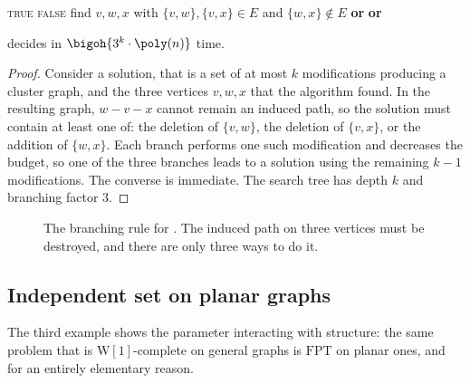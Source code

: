 \begin{algorithm}[ht]
\caption{Branching for }
\label{alg:fpt-cluster}
\begin{algorithmic}[1]
     \Return \textsc{true} \EndIf
     \Return \textsc{false} \EndIf
    \State find $v,w,x$ with $\{v,w\},\{v,x\} \in E$ and $\{w,x\} \notin E$
    \State \Return {} \textbf{ or }
                    \textbf{ or }
  \EndFunction
\end{algorithmic}
\end{algorithm}

\begin{theorem}\label{thm:fpt-cluster}
 decides  in
$\bigoh{3^k \cdot \poly(n)}$ time.
\end{theorem}

\begin{proof}
Consider a solution, that is a set of at most $k$ modifications producing a
cluster graph, and the three vertices $v,w,x$ that the algorithm found. In the
resulting graph, $w-v-x$ cannot remain an induced path, so the solution must
contain at least one of: the deletion of $\{v,w\}$, the deletion of $\{v,x\}$,
or the addition of $\{w,x\}$. Each branch performs one such modification and
decreases the budget, so one of the three branches leads to a solution using the
remaining $k-1$ modifications. The converse is immediate. The search tree has
depth $k$ and branching factor $3$.
\end{proof}

\begin{figure}[ht]
\centering
{}
\caption{The branching rule for . The induced path on
three vertices must be destroyed, and there are only three ways to do it.}
\label{fig:fpt-cluster}
\end{figure}

\subsection{Independent set on planar graphs}

The third example shows the parameter interacting with structure: the same
problem that is $\mathrm{W}[1]$-complete on general graphs is $\mathrm{FPT}$ on
planar ones, and for an entirely elementary reason.

